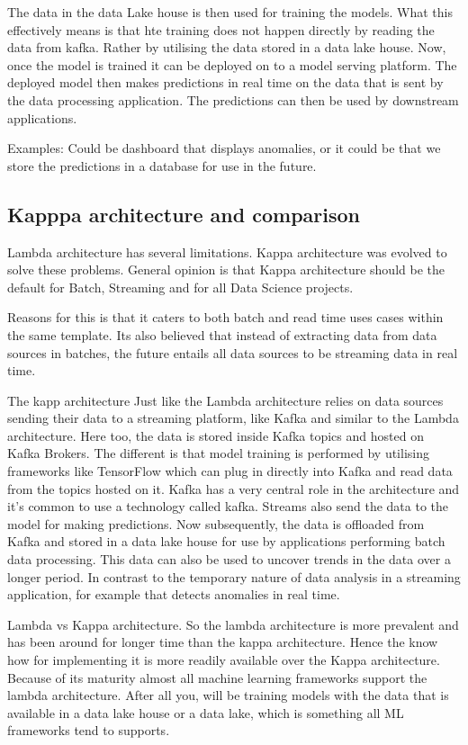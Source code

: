 \documentclass[a4paper, 11pt]{article}
\begin{document}
    The data in the data Lake house is then used for training the models.
    What this effectively means is that hte training does not happen directly by reading the data from kafka.
    Rather by utilising the data stored in a data lake house.
    Now, once the model is trained it can be deployed on to a model serving platform.
    The deployed model then makes predictions in real time on the data that is sent by the data processing application.
    The predictions can then be used by downstream applications.

    Examples:
    Could be dashboard that displays anomalies, or it could be that we store the predictions in a database for use in the future.

    \subsection{Kapppa architecture and comparison}

    Lambda architecture has several limitations.
    Kappa architecture was evolved to solve these problems.
    General opinion is that Kappa architecture should be the default for Batch, Streaming and for all Data Science projects.

    Reasons for this is that it caters to both batch and read time uses cases within the same template.
    Its also believed that instead of extracting data from data sources in batches, the future entails all data sources to be streaming data in real time.

    The kapp architecture
    Just like the Lambda architecture relies on data sources sending their data to a streaming platform, like Kafka and similar to the Lambda architecture.
    Here too, the data is stored inside Kafka topics and hosted on Kafka Brokers.
    The different is that model training is performed by utilising frameworks like TensorFlow which can plug in directly into Kafka and read data from the topics hosted on it.
    Kafka has a very central role in the architecture and it's common to use a technology called kafka.
    Streams also send the data to the model for making predictions.
    Now subsequently, the data is offloaded from Kafka and stored in a data lake house for use by applications performing batch data processing.
    This data can also be used to uncover trends in the data over a longer period.
    In contrast to the temporary nature of data analysis in a streaming application, for example that detects anomalies in real time.

    Lambda vs Kappa architecture.
    So the lambda architecture is more prevalent and has been around for longer time than the kappa architecture.
    Hence the know how for implementing it is more readily available over the Kappa architecture.
    Because of its maturity almost all machine learning frameworks support the lambda architecture.
    After all you, will be training models with the data that is available in a data lake house or a data lake, which is something all ML frameworks tend to supports.
\end{document}
